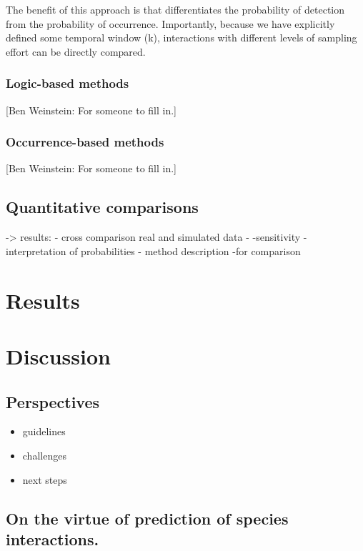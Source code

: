 The benefit of this approach is that differentiates the probability of detection
from the probability of occurrence. Importantly, because we have explicitly
defined some temporal window (k), interactions with different levels of sampling
effort can be directly compared.


\subsubsection*{Logic-based methods}\label{logic-based-methods}

{[}Ben Weinstein: For someone to fill in.{]}

\subsubsection*{Occurrence-based methods}\label{occurrence-based-methods}

{[}Ben Weinstein: For someone to fill in.{]}


\subsection*{Quantitative comparisons}\label{quantitative-comparisons}

-\textgreater{} results: - cross comparison \textbar{} real and simulated data -
-sensitivity \textbar{} - interpretation of probabilities - method description
-for comparison

\section*{Results}\label{results}

\section*{Discussion}\label{discussion}

\subsection*{Perspectives}\label{perspectives}

\begin{itemize} \item guidelines \item challenges \item next steps \end{itemize}

\subsection*{On the virtue of prediction of species
interactions.}\label{on-the-virtue-of-prediction-of-species-interactions.}

